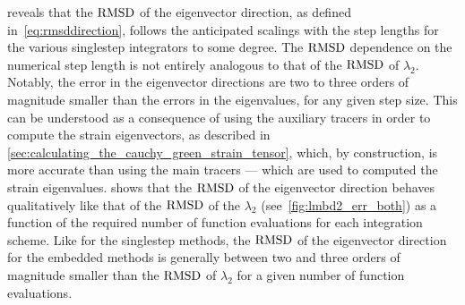  reveals that the $\operatorname{RMSD}$ of the eigenvector direction,
as defined in~\cref{eq:rmsddirection}, follows the anticipated scalings with
the step lengths for the various singlestep integrators to some degree. The
$\operatorname{RMSD}$ dependence on the numerical step length is not entirely analogous to
that of the $\operatorname{RMSD}$ of $\lambda_{2}$. Notably, the error in the eigenvector
directions are two to three orders of magnitude smaller than the errors
in the eigenvalues, for any given step size. This can be understood as a
consequence of using the auxiliary tracers in order to compute the strain
eigenvectors, as described in
\cref{sec:calculating_the_cauchy_green_strain_tensor}, which, by construction,
is more accurate than using the main tracers --- which are used to computed
the strain eigenvalues.  shows that the $\operatorname{RMSD}$ of
the eigenvector direction behaves qualitatively like that of the
$\operatorname{RMSD}$ of the $\lambda_{2}$ (see~\cref{fig:lmbd2_err_both}) as a function
of the required number of function evaluations for each integration scheme.
Like for the singlestep methods, the $\operatorname{RMSD}$ of the eigenvector direction for
the embedded methods is generally between two and three orders of magnitude
smaller than the $\operatorname{RMSD}$ of $\lambda_{2}$ for a given number of function
evaluations.

